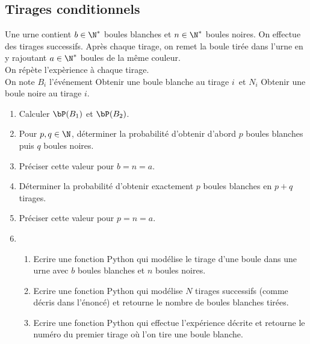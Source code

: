 \subsection{Tirages conditionnels  }

\begin{exercice}
Une urne contient $b\in \N^*$ boules blanches et $n\in \N^*$ boules noires. On effectue des tirages successifs. Après chaque tirage, on remet la boule tirée dans l'urne en y rajoutant $a\in \N^*$ boules de la même couleur. \\
On répète l'expèrience à chaque tirage. \\
On note $B_i$ l'événement \og Obtenir une boule blanche au tirage $i$\fg \, et $N_i$    \og Obtenir une boule noire au tirage $i$\fg.
\begin{enumerate}
\item Calculer $\bP(B_1)$ et $\bP(B_2)$.
\item Pour $p,q\in \N$, déterminer la probabilité d'obtenir d'abord $p$ boules blanches puis $q$ boules noires. 
\item Préciser cette valeur pour $b=n=a$. 
\item Déterminer la probabilité d'obtenir exactement $p$ boules blanches en $p+q$ tirages. 
\item Préciser cette valeur pour $p=n=a$. 
\item 
\begin{enumerate}
\item Ecrire une fonction Python qui modélise  le tirage d'une boule dans une urne avec $b$ boules blanches et $n$ boules noires.
\item Ecrire une fonction Python qui modélise $N$ tirages successifs (comme décris dans l'énoncé) et retourne le nombre de boules blanches tirées. 
\item Ecrire une fonction Python qui effectue l'expérience décrite et retourne le numéro du premier tirage où l'on tire une boule blanche. 
\end{enumerate}

\end{enumerate}
\end{exercice}

